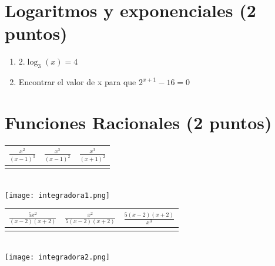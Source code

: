 \documentclass[a4paper,11pt,spanish,sans]{exam}
\newcommand{\Ts}{\rule{0pt}{2.8ex}}       %
\newcommand{\Bs}{\rule[-1.5ex]{0pt}{0pt}} %
\begin{document}
\section{Logaritmos y exponenciales (2 puntos)}
\begin{enumerate}
	
	\item $2.\log_3(x)=4$
	
	\item Encontrar el valor de x para que $2^{x+1}-16=0$
	
\end{enumerate}


\section{Funciones Racionales (2 puntos)}

\begin{minipage}{0.5\textwidth}
	\centering
	\label{mc1}
	\begin{tabular}{|c|c|c|}
		\hline
		$\frac{x^2}{(x-1)^3}$  & $\frac{x^3}{(x-1)^2}$ & $\frac{x^3}{(x+1)^2}$ \Ts \Bs   \\ \hline
		&   &      \\ \hline
	\end{tabular}\\
	\centering
	\texttt{[image: integradora1.png]}
\end{minipage}
\begin{minipage}{.5\textwidth}
	\centering
	\begin{tabular}{|c|c|c|}
		\hline
		$\frac{5x^2}{(x-2)(x+2)}$  & $\frac{x^2}{5(x-2)(x+2)}$ & $\frac{5(x-2)(x+2)}{x^3}$ \Ts \Bs   \\ \hline
		&   &      \\ \hline
	\end{tabular}\\
	\centering
	\texttt{[image: integradora2.png]}
\end{minipage}\\
\end{document}
